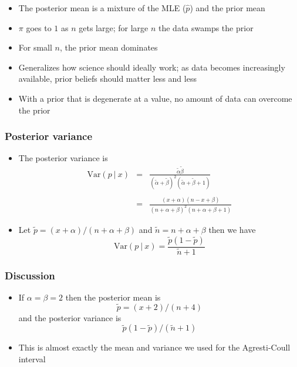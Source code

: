 \documentclass[aspectratio=169]{beamer}
\newcommand{\Var}{\mathrm{Var}}
\begin{document}
\begin{frame}
\begin{itemize}
\item The posterior mean is a mixture of the MLE ($\hat p$) and the
  prior mean
\item $\pi$ goes to $1$ as $n$ gets large; for large $n$ the data swamps the prior
\item For small $n$, the prior mean dominates 
\item Generalizes how science should ideally work; as data becomes
  increasingly available, prior beliefs should matter less and less
\item With a prior that is degenerate at a value, no amount of data
  can overcome the prior
\end{itemize}
\end{frame}

\begin{frame}\frametitle{Posterior variance}
\begin{itemize}
\item The posterior variance is
  \begin{eqnarray*}
\Var(p ~|~ x) & = & \frac{\tilde \alpha \tilde \beta}%
{(\tilde \alpha + \tilde \beta)^2 (\tilde \alpha + \tilde \beta + 1)} \\ \\
& = & 
\frac{ (x + \alpha)(n - x + \beta)}%
{(n + \alpha + \beta)^2 (n + \alpha + \beta + 1)}
\end{eqnarray*}
\item Let $\tilde p = (x + \alpha) / (n + \alpha + \beta)$ and $\tilde n = n + \alpha + \beta$ then we have
$$
\Var(p ~|~ x) = \frac{\tilde p (1 - \tilde p)}{\tilde n + 1}
$$
\end{itemize}
\end{frame}

\begin{frame}\frametitle{Discussion}
\begin{itemize}
\item If $\alpha = \beta = 2$ then the posterior mean is
$$
\tilde p = (x + 2) / (n + 4)
$$
and the posterior variance is 
$$
\tilde p (1 - \tilde p) / (\tilde n + 1)
$$
\item This is almost exactly the mean and variance we used for
  the Agresti-Coull interval
\end{itemize}
\end{frame}
\end{document}
